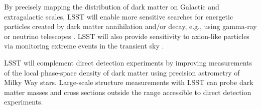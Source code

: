 \documentclass[12pt]{article}
\begin{document}
 By precisely mapping the distribution of dark matter on Galactic and extragalactic scales, LSST will enable more sensitive searches for energetic particles created by dark matter annihilation and/or decay, e.g., using gamma-ray or neutrino telescopes \citep{Charles:2016,Albert:2017,1404.5503}.
LSST will also provide sensitivity to axion-like particles via monitoring extreme events in the transient sky \citep{2017PhRvL.118a1103M}.



 LSST will complement direct detection experiments by improving measurements of the local phase-space density of dark matter using precision astrometry of Milky Way stars.
Large-scale structure measurements with LSST can probe dark matter masses and cross sections outside the range accessible to direct detection experiments.

\end{document}
